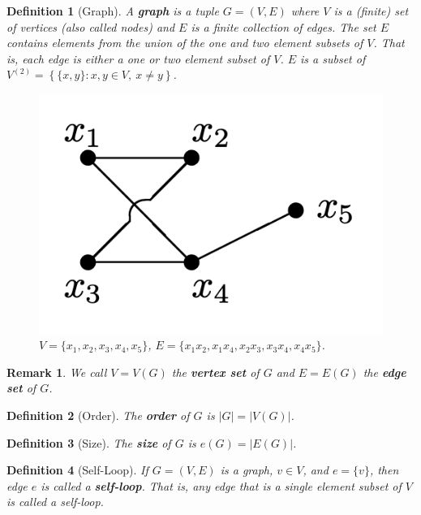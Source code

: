 \documentclass[cm,linguex]{glossa}
\theoremstyle{defn}
\newtheorem{defn}{Definition}
\theoremstyle{axiom}
\theoremstyle{thm}
\theoremstyle{lem}
\theoremstyle{cor}
\theoremstyle{prop}
\theoremstyle{rmk}
\newtheorem*{rmk}{Remark}
\begin{document}
\begin{defn}[Graph]
A \textbf{graph} is a tuple $G = (V,E)$ where $V$ is a (finite) set of \emph{vertices} (also called \emph{nodes}) and $E$ is a finite collection of \emph{edges}. The set $E$ contains elements from the union of the one and two element subsets of $V$. That is, each edge is either a one or two element subset of $V$. $E$ is a subset of $V^{(2)} = \left\{\{x, y\} : x, y \in V,\ x \neq y \right\}$.

\begin{figure}[H]
\centering
\includegraphics[scale=0.4]{fig/1.png}
\caption{$V = \{x_1, x_2, x_3, x_4, x_5\}$, $E = \{x_1 x_2, x_1 x_4, x_2 x_3, x_3 x_4, x_4 x_5\}$.}
\end{figure}
\end{defn}

\begin{rmk}
We call $V = V(G)$ the \textbf{vertex set} of $G$ and $E = E(G)$ the \textbf{edge set} of $G$.
\end{rmk}

\begin{defn}[Order]
The \textbf{order} of $G$ is $\lvert G \rvert = \lvert V(G) \rvert$.
\end{defn}

\begin{defn}[Size]
The \textbf{size} of $G$ is $e(G) = \lvert E(G) \rvert$.
\end{defn}

\begin{defn}[Self-Loop]
If $G = (V,E)$ is a graph, $v \in V$, and $e = \{v\}$, then edge $e$ is called a \textbf{self-loop}. That is, any edge that is a single element subset of $V$ is called a self-loop.
\end{defn}
\end{document}

